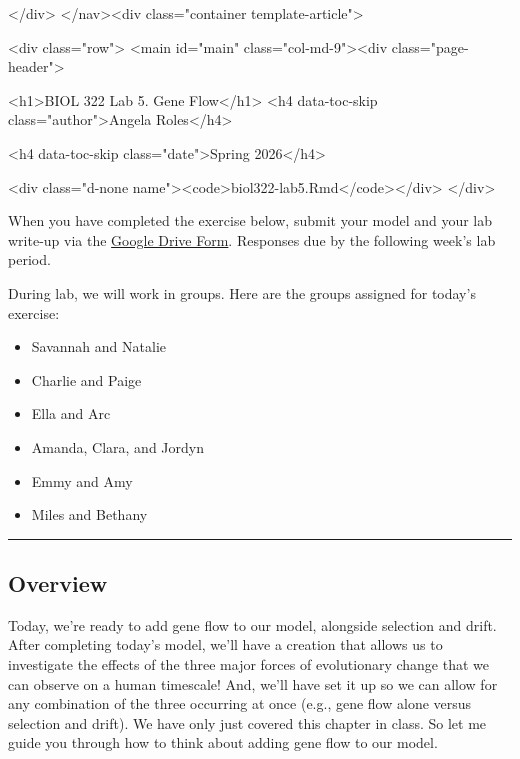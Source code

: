   </div>
</nav><div class="container template-article">


<div class="row">
  <main id="main" class="col-md-9"><div class="page-header">

      <h1>BIOL 322 Lab 5. Gene Flow</h1>
                        <h4 data-toc-skip class="author">Angela
Roles</h4>
            
            <h4 data-toc-skip class="date">Spring 2026</h4>
      

      <div class="d-none name"><code>biol322-lab5.Rmd</code></div>
    </div>

    
    
When you have completed the exercise below, submit your model and your
lab write-up via the \href{https://forms.gle/E3QLACX1aA2Q6ist5}{Google
Drive Form}. Responses due by the following week's lab period.

During lab, we will work in groups. Here are the groups assigned for
today's exercise:

\begin{itemize}
\tightlist
\item
  Savannah and Natalie
\item
  Charlie and Paige
\item
  Ella and Arc
\item
  Amanda, Clara, and Jordyn
\item
  Emmy and Amy
\item
  Miles and Bethany
\end{itemize}

\begin{center}\rule{0.5\linewidth}{0.5pt}\end{center}

\subsection{Overview}\label{overview}

Today, we're ready to add gene flow to our model, alongside selection
and drift. After completing today's model, we'll have a creation that
allows us to investigate the effects of the three major forces of
evolutionary change that we can observe on a human timescale! And, we'll
have set it up so we can allow for any combination of the three
occurring at once (e.g., gene flow alone versus selection and drift). We
have only just covered this chapter in class. So let me guide you
through how to think about adding gene flow to our model.

